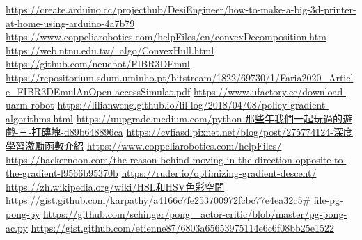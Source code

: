 \newpage
\renewcommand\bibname{參~考~文~獻}
\begin{thebibliography}{99}  %
\href{https://create.arduino.cc/projecthub/DesiEngineer/how-to-make-a-big-3d-printer-at-home-using-arduino-4a7b79}{https://create.arduino.cc/projecthub/DesiEngineer/how-to-make-a-big-3d-printer-at-home-using-arduino-4a7b79}
\href{https://www.coppeliarobotics.com/helpFiles/en/convexDecomposition.htm}{https://www.coppeliarobotics.com/helpFiles/en/convexDecomposition.htm}
\href{https://web.ntnu.edu.tw/~algo/ConvexHull.html}{https://web.ntnu.edu.tw/~algo/ConvexHull.html}
\href{https://github.com/neuebot/FIBR3DEmul}{https://github.com/neuebot/FIBR3DEmul}
\href{https://repositorium.sdum.uminho.pt/bitstream/1822/69730/1/Faria2020_Article_FIBR3DEmulAnOpen-accessSimulat.pdf}{https://repositorium.sdum.uminho.pt/bitstream/1822/69730/1/Faria2020_Article_FIBR3DEmulAnOpen-accessSimulat.pdf}
\href{https://www.ufactory.cc/download-uarm-robot}{https://www.ufactory.cc/download-uarm-robot}
\href{https://lilianweng.github.io/lil-log/2018/04/08/policy-gradient-algorithms.html}{https://lilianweng.github.io/lil-log/2018/04/08/policy-gradient-algorithms.html}\label{R.Policy Gradient}
\href{https://uupgrade.medium.com/python-那些年我們一起玩過的遊戲-三-打磚塊-d89b648896ca}{https://uupgrade.medium.com/python-那些年我們一起玩過的遊戲-三-打磚塊-d89b648896ca}
\href{https://cvfiasd.pixnet.net/blog/post/275774124-深度學習激勵函數介紹}{https://cvfiasd.pixnet.net/blog/post/275774124-深度學習激勵函數介紹}
\href{https://www.coppeliarobotics.com/helpFiles/}{https://www.coppeliarobotics.com/helpFiles/}
\href{https://hackernoon.com/the-reason-behind-moving-in-the-direction-opposite-to-the-gradient-f9566b95370b}{https://hackernoon.com/the-reason-behind-moving-in-the-direction-opposite-to-the-gradient-f9566b95370b}\label{OGD}
\href{https://ruder.io/optimizing-gradient-descent/}{https://ruder.io/optimizing-gradient-descent/}
\label{OGD2}
\href{https://reurl.cc/43XjEL}{https://zh.wikipedia.org/wiki/HSL和HSV色彩空間}
\label{RGBtoHSV}
\href{https://reurl.cc/gzMm4N}{https://gist.github.com/karpathy/a4166c7fe253700972fcbc77e4ea32c5\# file-pg-pong-py}\label{R.pong1}
\href{https://reurl.cc/95172Y}{https://github.com/schinger/pong\_ actor-critic/blob/master/pg-pong-ac.py}\label{R.pong1.1}
\href{https://gist.github.com/etienne87/6803a65653975114e6c6f08bb25e1522}{https://gist.github.com/etienne87/6803a65653975114e6c6f08bb25e1522}\label{R.pong2}
%
\end{thebibliography}
\newpage 
